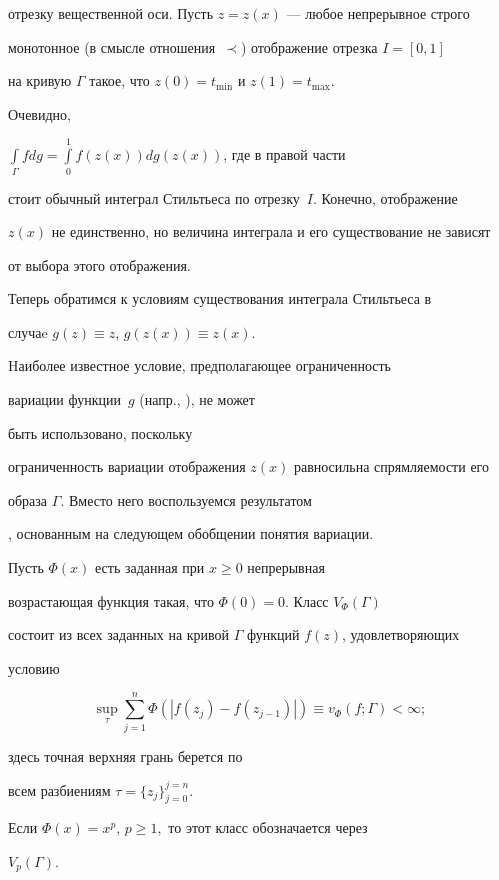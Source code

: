 отрезку вещественной оси. Пусть $z=z(x)$ --- любое непрерывное строго


монотонное (в смысле отношения~$\prec$) отображение отрезка $I = [0, 1]$


на кривую $\Gamma$ такое, что $z(0)=t_{\min}$ и $z(1)=t_{\max}$.


Очевидно,


$\int\limits_{\Gamma}fdg=\int\limits_0^1 f(z(x))dg(z(x))$, где в правой части


стоит обычный интеграл Стильтьеса по отрезку~$I$. Конечно, отображение


$z(x)$ не единственно, но величина интеграла и его существование не зависят


от выбора этого отображения.





Теперь обратимся к условиям существования интеграла Стильтьеса в


случаe $g(z)\equiv z$, $g(z(x))\equiv z(x)$.


Hаиболее известное условие, предполагающее ограниченность


вариации функции~$g$ (напр., \cite{R}), не может


быть использовано, поскольку


ограниченность вариации отображения $z(x)$ равносильна спрямляемости его


образа $\Gamma$. Вместо него воспользуемся результатом


\cite{Y2}, основанным на следующем обобщении понятия вариации.





\begin{defn}


Пусть $\Phi (x)$ есть заданная при $x\ge 0$ непрерывная


возрастающая функция такая, что $\Phi (0)=0$. Класс $V_{\Phi}(\Gamma)$


состоит из всех заданных на кривой $\Gamma$ функций $f(z)$, удовлетворяющих


условию


$$


\sup_{\tau}\sum_{j=1}^{n}\Phi(\left|f(z_{j})-f(z_{j-1})\right|)


\equiv v_{\Phi}(f;\Gamma)<\infty;


$$


здесь точная верхняя грань берется по


всем разбиениям $\tau = \{z_{j}\}_{j=0}^{j=n}$.


Если $\Phi (x) = x^p$, $p\ge 1,$ то этот класс обозначается через


$V_{p}(\Gamma)$.


\end{defn}





